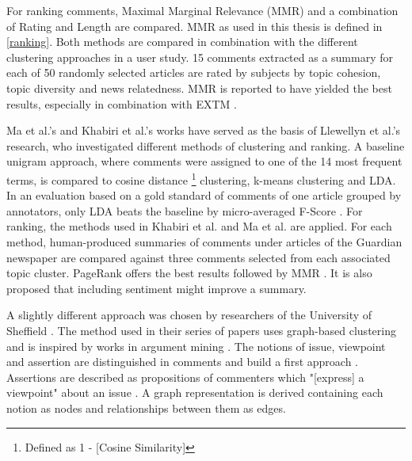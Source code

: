For ranking comments, Maximal Marginal Relevance (MMR) \cite{Carbonell:1998:UMD:290941.291025} and a combination of Rating and Length are compared. MMR as used in this thesis is defined in \autoref{ranking}. Both methods are compared in combination with the different clustering approaches in a user study. 15 comments extracted as a summary for each of 50 randomly selected articles are rated by subjects by topic cohesion, topic diversity and news relatedness. MMR is reported to have yielded the best results, especially in combination with EXTM \cite{DBLP:conf/cikm/MaSYC12}. \par
Ma et al.'s \cite{DBLP:conf/cikm/MaSYC12} and Khabiri et al.'s \cite{DBLP:conf/icwsm/KhabiriCH11} works have served as the basis of Llewellyn et al.'s \cite{llewellyn_grover_oberlander} research, who investigated different methods of clustering and ranking. A baseline unigram approach, where comments were assigned to one of the 14 most frequent terms, is compared to cosine distance \footnote{Defined as 1 - \hyperref[CoS][Cosine Similarity]} clustering, k-means clustering and LDA. In an evaluation based on a gold standard of comments of one article grouped by annotators, only LDA beats the baseline by micro-averaged F-Score \cite{llewellyn_grover_oberlander}. For ranking, the methods used in Khabiri et al. \cite{DBLP:conf/icwsm/KhabiriCH11} and Ma et al. \cite{DBLP:conf/cikm/MaSYC12} are applied. For each method, human-produced summaries of comments under articles of the Guardian newspaper are compared against three comments selected from each associated topic cluster. PageRank offers the best results followed by MMR \cite{llewellyn_grover_oberlander}. It is also proposed that including sentiment \cite{llewellyn_grover_oberlander} might improve a summary. \par
A slightly different approach was chosen by researchers of the University of Sheffield \cite{DBLP:conf/acl/BarkerG16, DBLP:conf/ecir/AkerKBPBHG16, DBLP:conf/lrec/BarkerPFKAFHG16, DBLP:conf/sigdial/BarkerPAKHG16, DBLP:conf/inlg/AkerPKFBHG16, DBLP:conf/ecir/FunkABPHG17}. The method used in their series of papers uses graph-based clustering and is inspired by works in argument mining \cite{DBLP:conf/acl/BarkerG16}. The notions of issue, viewpoint and assertion are distinguished in comments and build a first approach \cite{DBLP:conf/acl/BarkerG16}. Assertions are described as propositions of commenters which "[express] a viewpoint" about an issue \cite{DBLP:conf/acl/BarkerG16}.
A graph representation is derived containing each notion as nodes and relationships between them as edges.
